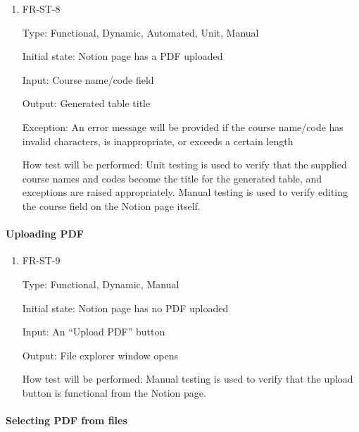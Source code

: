 \documentclass[12pt, titlepage]{article}
\begin{document}
\begin{enumerate}

\item{FR-ST-8\\}

Type: Functional, Dynamic, Automated, Unit, Manual 

Initial state: Notion page has a PDF uploaded 

Input: Course name/code field 

Output: Generated table title  

Exception: An error message will be provided if the course name/code has invalid characters, is inappropriate, or exceeds a certain length 

How test will be performed: Unit testing is used to verify that the supplied course names and codes become the title for the generated table, and exceptions are raised appropriately. Manual testing is used to verify editing the course field on the Notion page itself. 

\end{enumerate}

\paragraph{Uploading PDF}

\begin{enumerate}

\item{FR-ST-9\\}

Type: Functional, Dynamic, Manual 

Initial state: Notion page has no PDF uploaded 

Input: An “Upload PDF” button 

Output: File explorer window opens 

How test will be performed: Manual testing is used to verify that the upload button is functional from the Notion page. 

\end{enumerate}

\paragraph{Selecting PDF from files}
\end{document}
